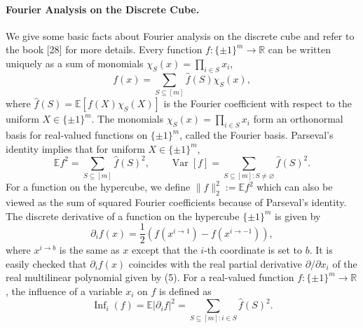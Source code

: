 \paragraph{Fourier Analysis on the Discrete Cube.}
We give some basic facts about Fourier analysis on the discrete cube and refer to the book [28] for more details. Every function $f:\{\pm1\}^m\to\mathbb R$ can be written uniquely as a sum of monomials $\chi_S(x)=\prod_{i\in S}x_i$,
\[f(x)=\sum_{S\subseteq[m]}\widehat f(S)\chi_S(x),\tag{5}\]
where $\widehat f(S)=\mathbb E[f(X)\chi_S(X)]$ is the Fourier coefficient with respect to the uniform $X\in\{\pm1\}^m$. The monomials $\chi_S(x)=\prod_{i\in S}x_i$ form an orthonormal basis for real-valued functions on $\{\pm1\}^m$, called the Fourier basis. Parseval's identity implies that for uniform $X\in\{\pm1\}^m$,
\[\mathbb Ef^2=\sum_{S\subseteq[m]}\widehat f(S)^2,\qquad\operatorname{Var}[f]=\sum_{S\subseteq[m]:S\neq\varnothing}\widehat f(S)^2.\]
For a function on the hypercube, we define $\|f\|_2^2:=\mathbb Ef^2$ which can also be viewed as the sum of squared Fourier coefficients because of Parseval's identity.
The discrete derivative of a function on the hypercube $\{\pm1\}^m$ is given by
\[\partial_i f(x)=\frac12(f(x^{i\to1})-f(x^{i\to-1})),\]
where $x^{i\to b}$ is the same as $x$ except that the $i$-th coordinate is set to $b$. It is easily checked that $\partial_i f(x)$ coincides with the real partial derivative $\partial/\partial x_i$ of the real multilinear polynomial given by (5).
For a real-valued function $f:\{\pm1\}^m\to\mathbb R$, the influence of a variable $x_i$ on $f$ is defined as
\[\operatorname{Inf}_i(f)=\mathbb E|\partial_i f|^2=\sum_{S\subseteq[m]:i\in S}\widehat f(S)^2.\]
